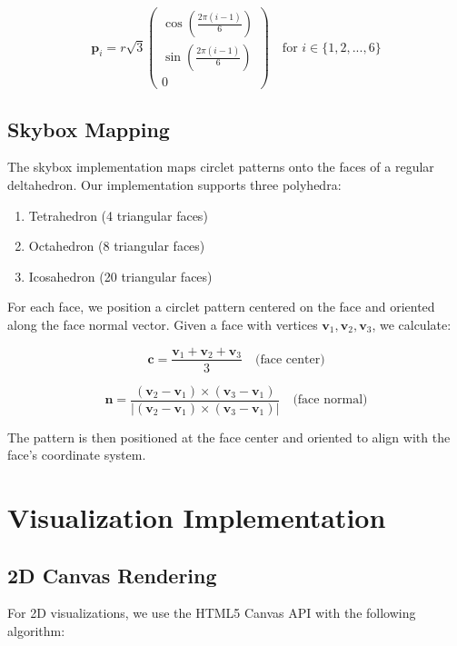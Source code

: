 \documentclass[12pt,a4paper]{article}
\begin{document}
\begin{equation}
\mathbf{p}_i = r\sqrt{3} \begin{pmatrix} \cos(\frac{2\pi(i-1)}{6}) \\ \sin(\frac{2\pi(i-1)}{6}) \\ 0 \end{pmatrix} \quad \text{for } i \in \{1, 2, ..., 6\}
\end{equation}

\subsection{Skybox Mapping}
The skybox implementation maps circlet patterns onto the faces of a regular deltahedron. Our implementation supports three polyhedra:

\begin{enumerate}
    \item Tetrahedron (4 triangular faces)
    \item Octahedron (8 triangular faces)
    \item Icosahedron (20 triangular faces)
\end{enumerate}

For each face, we position a circlet pattern centered on the face and oriented along the face normal vector. Given a face with vertices $\mathbf{v}_1, \mathbf{v}_2, \mathbf{v}_3$, we calculate:

\begin{equation}
\mathbf{c} = \frac{\mathbf{v}_1 + \mathbf{v}_2 + \mathbf{v}_3}{3} \quad \text{(face center)}
\end{equation}

\begin{equation}
\mathbf{n} = \frac{(\mathbf{v}_2 - \mathbf{v}_1) \times (\mathbf{v}_3 - \mathbf{v}_1)}{|(\mathbf{v}_2 - \mathbf{v}_1) \times (\mathbf{v}_3 - \mathbf{v}_1)|} \quad \text{(face normal)}
\end{equation}

The pattern is then positioned at the face center and oriented to align with the face's coordinate system.

\section{Visualization Implementation}

\subsection{2D Canvas Rendering}
For 2D visualizations, we use the HTML5 Canvas API with the following algorithm:
\end{document}
